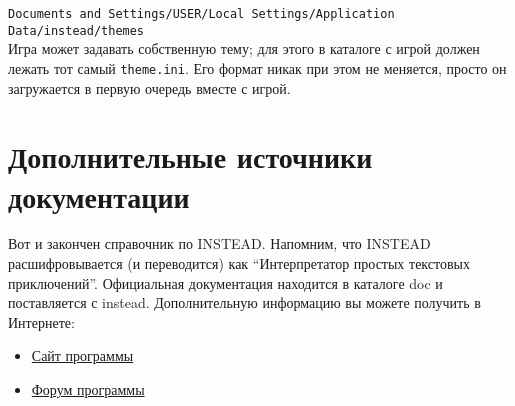 \documentclass[a4paper,12pt]{article}
\begin{document}
 \verb.Documents and Settings/USER/Local Settings/Application Data/instead/themes.\\

Игра может задавать собственную тему; для этого в каталоге с игрой должен лежать тот самый \verb/theme.ini/. Его формат никак при этом не меняется, просто он загружается в первую очередь вместе с игрой.

\section{Дополнительные источники документации}
Вот и закончен справочник по INSTEAD. Напомним, что INSTEAD расшифровывается (и переводится) как ``Интерпретатор простых текстовых приключений''. Официальная документация находится в каталоге doc и поставляется с instead. Дополнительную информацию вы можете получить в Интернете:

\begin{itemize}
\item \href{http://instead.googlecode.com/}{Сайт программы}
\item \href{http://instead.pinebrush.com/}{Форум программы}
\end{itemize}
\end{document}
